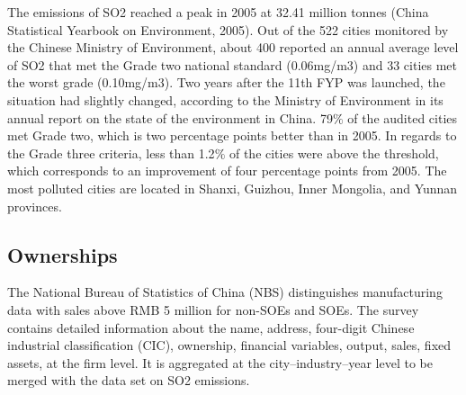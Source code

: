 \documentclass[12pt]{article}
\begin{document}
The emissions of SO2 reached a peak in 2005 at 32.41 million tonnes (China Statistical Yearbook on Environment, 2005). Out of the 522 cities monitored by the Chinese Ministry of Environment, about 400 reported an annual average level of SO2 that met the Grade two national standard (0.06mg/m3) and 33 cities met the worst grade (0.10mg/m3). Two years after the 11th FYP was launched, the situation had slightly changed, according to the Ministry of Environment in its annual report on the state of the environment in China. 79$\%$ of the audited cities met Grade two, which is two percentage points better than in 2005. In regards to the Grade three criteria, less than 1.2$\%$ of the cities were above the threshold, which corresponds to an improvement of four percentage points from 2005. The most polluted cities are located in Shanxi, Guizhou, Inner Mongolia, and Yunnan provinces.

\subsection{Ownerships}

The National Bureau of Statistics of China (NBS) distinguishes manufacturing data with sales above RMB 5 million for non-SOEs and SOEs. The survey contains detailed information about the name, address, four-digit Chinese industrial classification (CIC), ownership, financial variables, output, sales, fixed assets, at the firm level. It is aggregated at the city–industry–year level to be merged with the data set on SO2 emissions.
\end{document}
